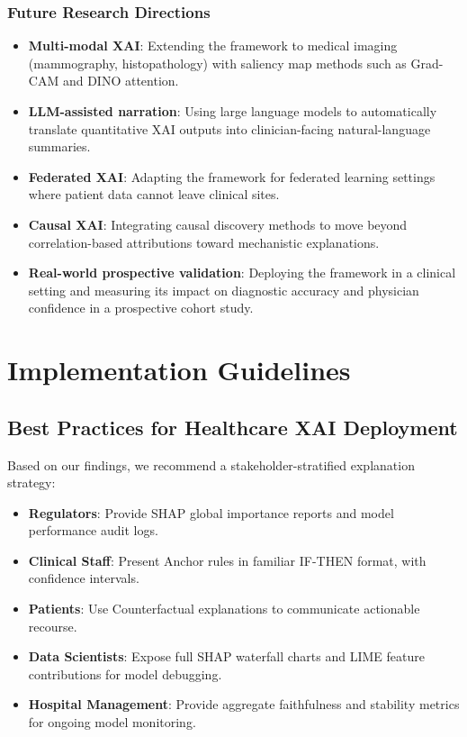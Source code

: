 \documentclass[journal]{IEEEtran}
\begin{document}
\subsubsection{Future Research Directions}

\begin{itemize}
\item \textbf{Multi-modal XAI}: Extending the framework to medical imaging (mammography, histopathology) with saliency map methods such as Grad-CAM and DINO attention.
\item \textbf{LLM-assisted narration}: Using large language models to automatically translate quantitative XAI outputs into clinician-facing natural-language summaries.
\item \textbf{Federated XAI}: Adapting the framework for federated learning settings where patient data cannot leave clinical sites.
\item \textbf{Causal XAI}: Integrating causal discovery methods to move beyond correlation-based attributions toward mechanistic explanations.
\item \textbf{Real-world prospective validation}: Deploying the framework in a clinical setting and measuring its impact on diagnostic accuracy and physician confidence in a prospective cohort study.
\end{itemize}

\section{Implementation Guidelines}

\subsection{Best Practices for Healthcare XAI Deployment}

Based on our findings, we recommend a stakeholder-stratified explanation strategy:

\begin{itemize}
\item \textbf{Regulators}: Provide SHAP global importance reports and model performance audit logs.
\item \textbf{Clinical Staff}: Present Anchor rules in familiar IF-THEN format, with confidence intervals.
\item \textbf{Patients}: Use Counterfactual explanations to communicate actionable recourse.
\item \textbf{Data Scientists}: Expose full SHAP waterfall charts and LIME feature contributions for model debugging.
\item \textbf{Hospital Management}: Provide aggregate faithfulness and stability metrics for ongoing model monitoring.
\end{itemize}
\end{document}
